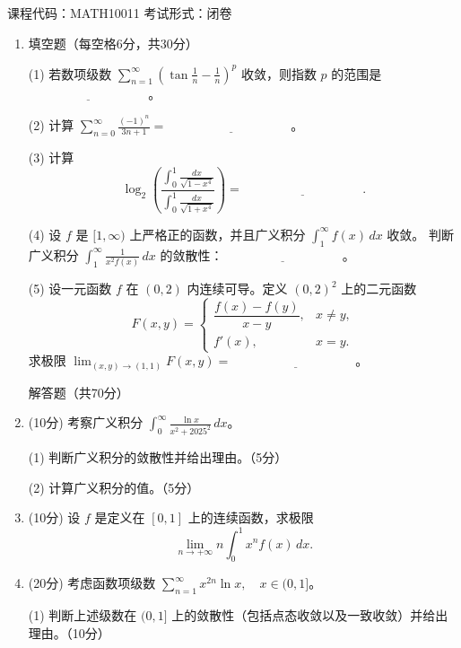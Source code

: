 \begin{center}
课程代码：MATH10011 \quad 考试形式：闭卷
\end{center}

\begin{enumerate}
\item 填空题（每空格6分，共30分）

(1) 若数项级数 \(\displaystyle\sum_{n=1}^{\infty}\left(\tan\frac{1}{n}-\frac{1}{n}\right)^{p}\) 收敛，则指数 \(p\) 的范围是 $\underline{\hspace{4cm}}$。

(2) 计算 \(\displaystyle\sum_{n=0}^{\infty}\frac{(-1)^{n}}{3n+1} =\) $\underline{\hspace{4cm}}$。

(3) 计算 
\[
\log_2\left(
\frac{\displaystyle\int_0^1 \frac{dx}{\sqrt{1-x^4}}}{\displaystyle\int_0^1 \frac{dx}{\sqrt{1+x^4}}}
\right)= \underline{\hspace{4cm}} .
\]

(4) 设 \(f\) 是 \([1,\infty)\) 上严格正的函数，并且广义积分 \(\displaystyle\int_1^\infty f(x)\,dx\) 收敛。
判断广义积分 \(\displaystyle\int_1^\infty \frac{1}{x^2 f(x)}\,dx\) 的敛散性：$\underline{\hspace{4cm}}$。

(5) 设一元函数 \(f\) 在 \((0,2)\) 内连续可导。定义 \((0,2)^2\) 上的二元函数
\[
F(x,y)=
\begin{cases}
\dfrac{f(x)-f(y)}{x-y}, & x\neq y,\\[6pt]
f'(x), & x=y.
\end{cases}
\]
求极限 \(\displaystyle\lim_{(x,y)\to(1,1)} F(x,y) =\) $\underline{\hspace{4cm}}$。

解答题（共70分）

\item (10分)
考察广义积分 \(\displaystyle \int_{0}^{\infty} \frac{\ln x}{x^{2}+2025^{2}}\,dx\)。

(1) 判断广义积分的敛散性并给出理由。（5分）

(2) 计算广义积分的值。（5分）

\item (10分)
设 \(f\) 是定义在 \([0,1]\) 上的连续函数，求极限
\[
\lim_{n\to+\infty} n\int_{0}^{1}x^{n}f(x)\,dx .
\]

\item (20分)
考虑函数项级数 \(\displaystyle \sum_{n=1}^{\infty} x^{2n}\ln x,\quad x\in(0,1]\)。

(1) 判断上述级数在 \((0,1]\) 上的敛散性（包括点态收敛以及一致收敛）并给出理由。（10分）


\end{enumerate}
